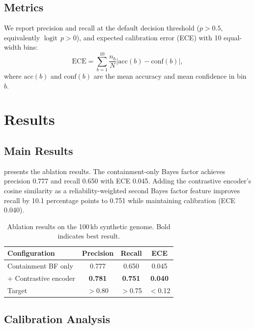 \documentclass[11pt,a4paper]{article}
\DeclareMathOperator{\logit}{logit}
\begin{document}
\subsection{Metrics}

We report precision and recall at the default decision threshold
($p > 0.5$, equivalently $\logit\, p > 0$), and expected calibration
error (ECE) with 10 equal-width bins:
\begin{equation}
  \mathrm{ECE} = \sum_{b=1}^{10} \frac{n_b}{N}
    \left| \mathrm{acc}(b) - \mathrm{conf}(b) \right|,
\end{equation}
where $\mathrm{acc}(b)$ and $\mathrm{conf}(b)$ are the mean accuracy
and mean confidence in bin $b$.


\section{Results}
\label{sec:results}

\subsection{Main Results}

 presents the ablation results.  The containment-only
Bayes factor achieves precision 0.777 and recall 0.650 with ECE 0.045.
Adding the contrastive encoder's cosine similarity as a
reliability-weighted second Bayes factor feature improves recall by
10.1 percentage points to 0.751 while maintaining calibration
(ECE 0.040).

\begin{table}[ht]
  \centering
  \caption{Ablation results on the 100\,kb synthetic genome.
    Bold indicates best result.}
  \label{tab:main}
  \begin{tabular}{lccc}
    \toprule
    Configuration & Precision & Recall & ECE \\
    \midrule
    Containment BF only        & 0.777 & 0.650 & 0.045 \\
    + Contrastive encoder      & \textbf{0.781} & \textbf{0.751} & \textbf{0.040} \\
    \midrule
    Target                     & $>$0.80 & $>$0.75 & $<$0.12 \\
    \bottomrule
  \end{tabular}
\end{table}

\subsection{Calibration Analysis}
\end{document}
